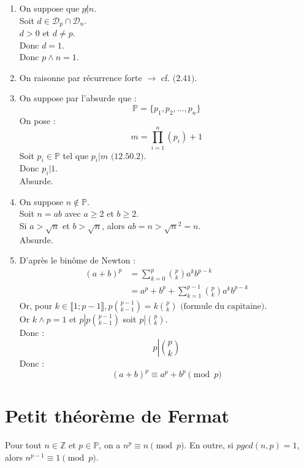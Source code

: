 \documentclass[../main.tex]{subfiles}
\begin{document}
\begin{enumerate}
    \item On suppose que $p \not | n$. \\
    Soit $d \in \mathcal{D}_p \cap \mathcal{D}_{n}$. \\
    $d > 0$ et $d \neq p$. \\
    Donc $d = 1$. \\
    Donc $p \wedge n = 1$.

    \item On raisonne par récurrence forte $\rightarrow$ cf. $\text{(2.41)}$. 
    
    \item On suppose par l'absurde que : 
    $$\mathbb{P} = \{p_1, p_2, \ldots, p_n\}$$
    On pose : 
    $$m = \prod_{i = 1}^{n} (p_i) + 1$$
    Soit $p_i \in \mathbb{P}$ tel que $p_i | m \text{ (12.50.2)}$. \\
    Donc $p_i | 1$. \\
    Absurde. 

    \item On suppose $n \not \in \mathbb{P}$. \\
    Soit $n = ab$ avec $a \geq 2$ et $b \geq 2$. \\
    Si $a > \sqrt{n}$ et $b > \sqrt{n}$, alors $ab = n > \sqrt{n}^2 = n$. \\
    Absurde.

    \item D'après le binôme de Newton : 
    \begin{align*}
        (a + b)^p &= \sum_{k = 0}^{p} \binom{p}{k} a^{k}b^{p-k} \\
        &= a^p + b^p + \sum_{k = 1}^{p-1} \binom{p}{k} a^{k}b^{p-k} 
    \end{align*}
    Or, pour $k \in \llbracket 1 ; p-1 \rrbracket, p \binom{p - 1}{k - 1} = k \binom{p}{k} \text{ (formule du capitaine)}$.  \\
    Or $k \wedge p = 1$ et $p \left| p \binom{p-1}{k-1} \right.$ soit $p \left| \binom{p}{k} \right.$. \\
    Donc : 
    $$ p \left| \binom{p}{k} \right.$$ 
    Donc :
    $$(a + b)^p \equiv a^p + b^p \pmod p$$
\end{enumerate}

\section{Petit théorème de Fermat}
\begin{tcolorbox}[title=Théorème 12.51, title filled=false, colframe=orange, colback=orange!10!white]
    Pour tout $n \in \mathbb{Z}$ et $p \in \mathbb{P}$, on a $n^p \equiv n \pmod p$. En outre, si $pgcd(n,p) = 1$, alors $n^{p-1} \equiv 1 \pmod p$.
\end{tcolorbox}
\end{document}
